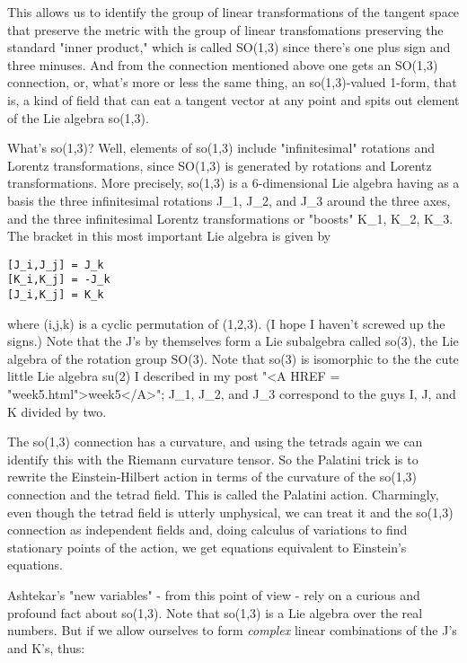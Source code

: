 This allows us to identify the group of linear transformations of the
tangent space that preserve the metric with the group of linear
transfomations preserving the standard "inner product," which is called
SO(1,3) since there's one plus sign and three minuses.  And from the
connection mentioned above one gets an SO(1,3) connection, or, what's
more or less the same thing, an so(1,3)-valued 1-form, that is, a kind
of field that can eat a tangent vector at any point and spits out 
element of the Lie algebra so(1,3).  

What's so(1,3)?  Well, elements of so(1,3) include
"infinitesimal" rotations and Lorentz transformations, since
SO(1,3) is generated by rotations and Lorentz transformations.  More
precisely, so(1,3) is a 6-dimensional Lie algebra having as a basis the
three infinitesimal rotations J_1, J_2, and J_3 around the three axes,
and the three infinitesimal Lorentz transformations or "boosts" K_1,
K_2, K_3.  The bracket in this most important Lie algebra is given by

\begin{verbatim}
[J_i,J_j] = J_k
[K_i,K_j] = -J_k
[J_i,K_j] = K_k
\end{verbatim}
    

where (i,j,k) is a cyclic permutation of (1,2,3).  (I hope I haven't
screwed up the signs.)  Note that the J's by themselves form a Lie
subalgebra called so(3), the Lie algebra of the rotation group SO(3).
Note that so(3) is isomorphic to the the cute little Lie algebra su(2) I
described in my post "<A HREF = "week5.html">week5</A>"; J_1, J_2, and J_3 correspond to the guys
I, J, and K divided by two.  

The so(1,3) connection has a curvature, and using the tetrads again we
can identify this with the Riemann curvature tensor.  So the Palatini
trick is to rewrite the Einstein-Hilbert action in terms of the
curvature of the so(1,3) connection and the tetrad field.  This is
called the Palatini action.  Charmingly, even though the tetrad field is
utterly unphysical, we can treat it and the so(1,3) connection as
independent fields and, doing calculus of variations to find stationary
points of the action, we get equations equivalent to Einstein's
equations.

Ashtekar's "new variables" - from this point of view - rely on a curious
and profound fact about so(1,3).  Note that so(1,3) is a Lie algebra
over the real numbers.  But if we allow ourselves to form \emph{complex}
linear combinations of the J's and K's, thus:

